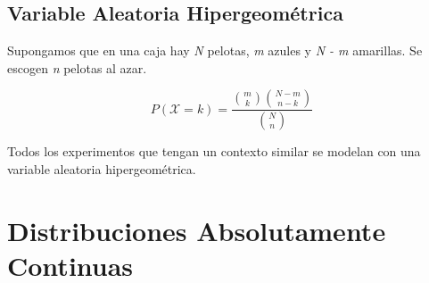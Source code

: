 \subsection{Variable Aleatoria Hipergeométrica}

Supongamos que en una caja hay \textit N pelotas, \textit m azules y \textit{N - m} amarillas. Se escogen \textit n pelotas al azar.

\[P(\mathcal X = k) = \frac{\binom{m}{k} \binom{N - m}{n-k} }{\binom{N}{n}}\]

\noindent Todos los experimentos que tengan un contexto similar se modelan con una variable aleatoria hipergeométrica.

\section{Distribuciones Absolutamente Continuas}

